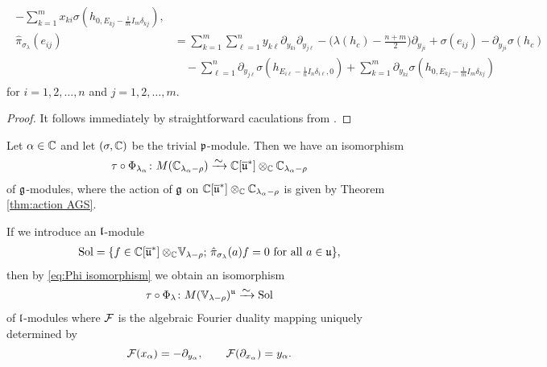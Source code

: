 \begin{theorem}
\begin{enumerate}
\begin{align}
\begin{aligned}
     - \sum_{k=1}^m x_{ki} \sigma(h_{0,E_{kj}-\frac{1}{m}I_m \delta_{kj}}),  \\
    \hat{\pi}_{\sigma_\lambda}(e_{ij})&= \sum_{k=1}^m \sum_{\ell=1}^n y_{k\ell} \partial_{y_{ki}} \partial_{y_{j\ell}} - \bigg(\lambda(h_c)-  \frac{n+m}{2}\bigg) \partial_{y_{ji}} + \sigma(e_{ij}) - \partial_{y_{ji}} \sigma(h_c)
    \\ &\quad - \sum_{\ell=1}^n \partial_{y_{j\ell}} \sigma(h_{E_{i\ell}-\frac{1}{n}I_n \delta_{i \ell},0})
     + \sum_{k=1}^m \partial_{y_{ki}} \sigma(h_{0,E_{kj}-\frac{1}{m}I_m \delta_{kj}})
  \end{aligned}
\end{align}
for $i=1,2,\dots,n$ and $j=1,2,\dots,m$.
\end{enumerate}
\end{theorem}

\begin{proof}
It follows immediately by straightforward caculations from \cite{krizka_algebraic_2017}.
\end{proof}


Let $\alpha \in \mathbb{C}$ and let $(\sigma,\mathbb{C})$ be the trivial $\mathfrak{p}$-module. Then we have an isomorphism
\begin{align}\label{eq:Phi isomorphism}
  \tau \circ \Phi_{\lambda_\alpha} \colon M(\C_{\lambda_\alpha-\rho}) \riso \C[\widebar{\mfrak{u}}^*] \otimes_\C \C_{\lambda_\alpha-\rho}
\end{align}
of $\mathfrak{g}$-modules, where the action of $\mathfrak{g}$ on $\mathbb{C}[\overline{\mathfrak{u}}^*] \otimes_{\mathbb{C}} \mathbb{C}_{\lambda_\alpha-\rho}$ is given by Theorem \ref{thm:action AGS}.
\medskip

If we introduce an $\mathfrak{l}$-module
\begin{align}
  \Sol = \{f \in \C[\widebar{\mfrak{u}}^*] \otimes_\C \!\mathbb{V}_{\lambda-\rho};\, \hat{\pi}_{\sigma_\lambda}(a)f=0\ \text{for all}\ a \in \mfrak{u}\},
\end{align}
then by \eqref{eq:Phi isomorphism} we obtain an isomorphism
\begin{align}
  \tau \circ \Phi_\lambda \colon M(\mathbb{V}_{\lambda-\rho})^\mfrak{u} \riso \Sol
\end{align}
of $\mathfrak{l}$-modules where $\mathcal{F}$ is the algebraic Fourier duality mapping uniquely determined by 
\begin{equation*}
  \mathcal{F}(x_\alpha) = -\partial_{y_\alpha}, \qquad \mathcal{F}(\partial_{x_\alpha})= y_\alpha.
\end{equation*}

